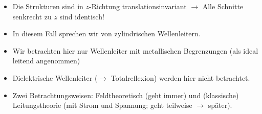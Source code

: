 \begin{frame}
\begin{itemize}[<+->]
\begin{columns}[t]
\begin{column}{.25\linewidth}
        \end{column}
      \end{columns}
    \item Die Strukturen sind in $z$-Richtung \alert{translationsinvariant} \(\to\) Alle Schnitte senkrecht zu $z$ sind identisch!
    \item In diesem Fall sprechen wir von \alert{zylindrischen Wellenleitern}.
    \item Wir betrachten hier nur Wellenleiter mit metallischen Begrenzungen (als ideal leitend angenommen)
    \item Dielektrische Wellenleiter (\(\to\) Totalreflexion) werden hier nicht betrachtet.
      \item Zwei Betrachtungsweisen: Feldtheoretisch (geht immer) und (klassische) \alert{Leitungstheorie} (mit Strom und Spannung; geht teilweise \(\to\) später).
  \end{itemize}
  \end{frame}

